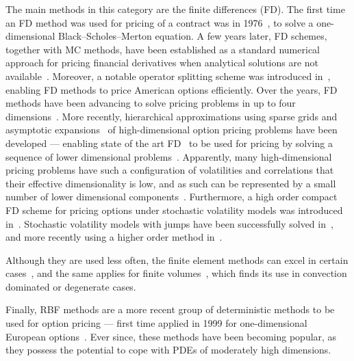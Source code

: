 \documentclass{UUThesisTemplate}
\begin{document}
\par
The main methods in this category are the finite differences (FD). The first time an FD method was used for pricing of a contract was in 1976~\cite{brennan1976pricing}, to solve a one-dimensional Black--Scholes--Merton equation. A few years later, FD schemes, together with MC methods, have been established as a standard numerical approach for pricing financial derivatives when analytical solutions are not available~\cite{brennan1978finite}. Moreover, a notable operator splitting scheme was introduced in~\cite{ikonen2004operator}, enabling FD methods to price American options efficiently. Over the years, FD methods have been advancing to solve pricing problems in up to four dimensions~\cite{lotstedt2007space, persson2010pricing}. More recently, hierarchical approximations using sparse grids and asymptotic expansions~\cite{reisinger2007efficient, reisinger2015numerical} of high-dimensional option pricing problems have been developed --- enabling state of the art FD~\cite{persson2007pricing, foulon2010adi, haentjens2012adi, during2015high} to be used for pricing by solving a sequence of lower dimensional problems~\cite{vonsydow2016pricing}. Apparently, many high-dimensional pricing problems have such a configuration of volatilities and correlations that their effective dimensionality is low, and as such can be represented by a small number of lower dimensional components~\cite{wang2005high}. Furthermore, a high order compact FD scheme for pricing options under stochastic volatility models was introduced in~\cite{during2012high}. Stochastic volatility models with jumps have been successfully solved in~\cite{salmi2014imex, von2015adaptive}, and more recently using a higher order method in~\cite{during2017high, during2017efficient}.
\par
Although they are used less often, the finite element methods can excel in certain cases~\cite{zvan1998general, forsyth1999finite, heinecke2012highly}, and the same applies for finite volumes~\cite{zvan2001finite}, which finds its use in convection dominated or degenerate cases.

\par
Finally, RBF methods are a more recent group of deterministic methods to be used for option pricing --- first time applied in 1999 for one-dimensional European options~\cite{hon1999radial}. Ever since, these methods have been becoming popular, as they possess the potential to cope with PDEs of moderately high dimensions.
%
\end{document}
